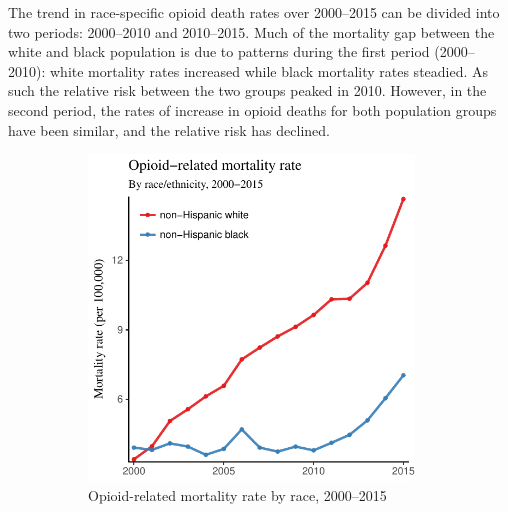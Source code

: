 \documentclass[12pt, a4paper]{article}
\begin{document}
The trend in race-specific opioid death rates over 2000--2015 can be divided into two periods: 2000--2010 and 2010--2015. Much of the mortality gap between the white and black population is due to patterns during the first period (2000--2010): white mortality rates increased while black mortality rates steadied. As such the relative risk between the two groups peaked in 2010. However, in the second period, the rates of increase in opioid deaths for both population groups have been similar, and the relative risk has declined. 

\begin{figure}[h!]
\begin{subfigure} [b]{0.5\textwidth} 
 \centering
\includegraphics[width=0.95\textwidth]{./plots/paper_fig2_overall_adjusted.pdf} 
 \caption{Opioid-related mortality rate by race, 2000--2015}
 \label{fig:overall}
 \end{subfigure} ~
 \begin{subfigure} [b]{0.5\textwidth} 
 \centering

\end{subfigure}
\end{figure}
\end{document}
